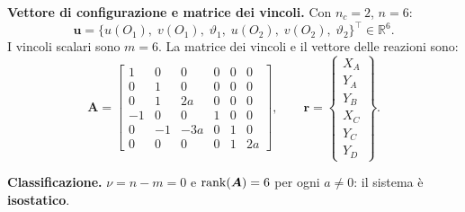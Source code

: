 \begin{esempio}
\begin{svolgimento}
		\noindent\textbf{Vettore di configurazione e matrice
			dei vincoli.}
		Con $n_c = 2$, $n = 6$:
		\begin{equation*}
			\bm{u} =
			\bigl\{u(O_1),\; v(O_1),\; \vartheta_1,\;
			u(O_2),\; v(O_2),\; \vartheta_2
			\bigr\}^\top \in \mathbb{R}^6.
		\end{equation*}
		I vincoli scalari sono $m = 6$. La matrice dei
		vincoli e il vettore delle reazioni sono:
		\begin{equation*}\label{eq:A_gerber}
			\bm{A} =
			\begin{bmatrix}
				1 &  0 &   0 & 0 & 0 &  0 \\
				0 &  1 &   0 & 0 & 0 &  0 \\
				0 &  1 &  2a & 0 & 0 &  0 \\
				-1 &  0 &   0 & 1 & 0 &  0 \\
				0 & -1 & -3a & 0 & 1 &  0 \\
				0 &  0 &   0 & 0 & 1 & 2a
			\end{bmatrix},
			\qquad
			\bm{r} =
			\begin{Bmatrix}
				X_A \\ Y_A \\ Y_B \\ X_C \\ Y_C \\ Y_D
			\end{Bmatrix}.
		\end{equation*}
		
		\noindent\textbf{Classificazione.}
		$\nu = n - m = 0$ e $\operatorname{rank}(\bm{A}) = 6$ per ogni
		$a \neq 0$: il sistema è \textbf{isostatico}.
		

\end{svolgimento}
\end{esempio}
